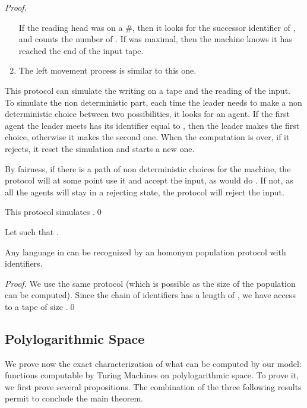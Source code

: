 \documentclass[UKenglish]{llncs}
\begin{document}
\begin{proof}
\begin{enumerate}
If the reading head was on a \#, then it looks for the successor identifier of , and counts the number of .
If  was maximal, then the machine knows it has reached the end of the input tape.

\item The left movement process is similar to this one.
\end{enumerate}

This protocol can simulate the writing on a tape and the reading of the input.\\

To simulate the non deterministic
part, each time the leader needs to make a non deterministic choice
between two possibilities, it looks for an agent. If the first
agent the leader meets has its identifier equal to , then the leader makes
the first choice, otherwise it makes the second one.
When the computation is over, if it rejects, it reset the simulation
and starts a new one.

By fairness, if there is a path of non deterministic choices for the machine,
the protocol will at some point use it and accept the input, as would do .
If not, as all the agents will stay in a rejecting state, the protocol will reject
the input.

This protocol simulates .\hfill \qed

\end{proof}

\begin{corollary}
Let  such that . 

Any language in   can be recognized by an homonym population protocol with  identifiers.
\end{corollary}
\begin{proof}
We use the same protocol (which is possible as the size of the population can be computed).
Since the chain of identifiers has a length of , we have access to a tape of size .\hfill \qed

\end{proof}

\subsection{Polylogarithmic Space}

We prove now the exact characterization of what can be computed
by our model: functions computable by Turing Machines on
polylogarithmic space. To prove it, we first prove several propositions.
The combination of the three following results permit to conclude the main theorem.
\end{document}

